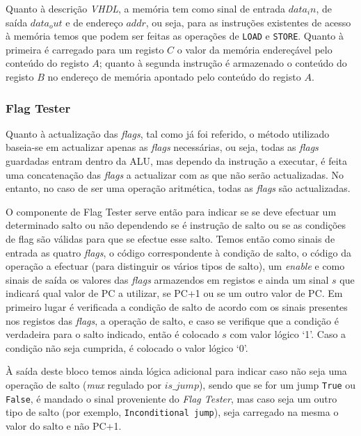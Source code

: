 \documentclass[a4paper]{article}
\begin{document}
				Quanto à descrição \emph{VHDL}, a memória tem como sinal de entrada $data_in$, de saída $data_out$ e de endereço $addr$, ou seja, para as instruções existentes de acesso à memória temos que podem ser feitas as operações de \texttt{LOAD} e \texttt{STORE}. Quanto à primeira é carregado para um registo $C$ o valor da memória endereçável pelo conteúdo do registo $A$; quanto à segunda instrução é armazenado o conteúdo do registo $B$ no endereço de memória apontado pelo conteúdo do registo $A$.
				
			\subsubsection{Flag Tester}
			
				Quanto à actualização das \textit{flags}, tal como já foi referido, o método utilizado baseia-se em actualizar apenas as \textit{flags} necessárias, ou seja, todas as \textit{flags} guardadas entram dentro da ALU, mas dependo da instrução a executar, é feita uma concatenação das \textit{flags} a actualizar com as que não serão actualizadas. No entanto, no caso de ser uma operação aritmética, todas as \textit{flags} são actualizadas.
			
				O componente de Flag Tester serve então para indicar se se deve efectuar um determinado salto ou não dependendo se é instrução de salto ou se as condições de flag são válidas para que se efectue esse salto. Temos então como sinais de entrada as quatro \textit{flags}, o código correspondente à condição de salto, o código da operação a efectuar (para distinguir os vários tipos de salto), um \textit{enable} e como sinais de saída os valores das \textit{flags} armazendos em registos e ainda um sinal $s$ que indicará qual valor de PC a utilizar, se PC+1 ou se um outro valor de PC. Em primeiro lugar é verificada a condição de salto de acordo com os sinais presentes nos registos das \textit{flags}, a operação de salto, e caso se verifique que a condição é verdadeira para o salto indicado, então é colocado $s$ com valor lógico ‘1’. Caso a condição não seja cumprida, é colocado o valor lógico ‘0’. 
				
				À saída deste bloco temos ainda lógica adicional para indicar caso não seja uma operação de salto (\textit{mux} regulado por $is\_jump$), sendo que se for um jump \texttt{True} ou \texttt{False}, é mandado o sinal proveniente do \emph{Flag Tester}, mas caso seja um outro tipo de salto (por exemplo, \texttt{Inconditional jump}), seja carregado na mesma o valor do salto e não PC+1.
			
\end{document}
